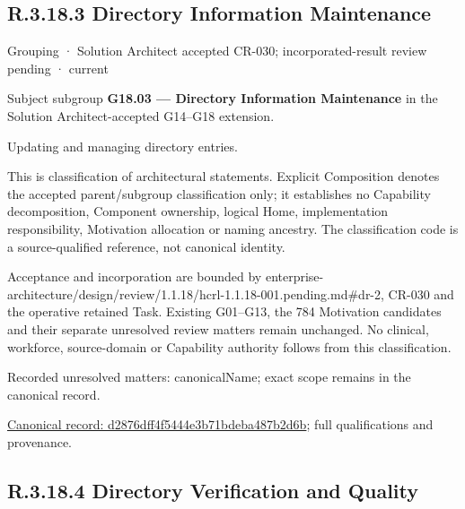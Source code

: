 \subsection*{R.3.18.3 Directory Information Maintenance}
\label{navigation:R.3.18.3}

\label{element:d2876dff4f5444e3b71bdeba487b2d6b}
{\small Grouping · Solution Architect accepted CR-030; incorporated-result review pending · current}\par

Subject subgroup \textbf{G18.03 — Directory Information Maintenance} in the Solution Architect-accepted G14–G18 extension.



Updating and managing directory entries.



This is classification of architectural statements. Explicit Composition denotes the accepted parent/subgroup classification only; it establishes no Capability decomposition, Component ownership, logical Home, implementation responsibility, Motivation allocation or naming ancestry. The classification code is a source-qualified reference, not canonical identity.



Acceptance and incorporation are bounded by enterprise-architecture/design/review/1.1.18/hcrl-1.1.18-001.pending.md\#dr-2, CR-030 and the operative retained Task. Existing G01–G13, the 784 Motivation candidates and their separate unresolved review matters remain unchanged. No clinical, workforce, source-domain or Capability authority follows from this classification.


{\small Recorded unresolved matters: canonicalName; exact scope remains in the canonical record.}\par
{\footnotesize \href{../../../../continuum/grouping/d2876dff4f5444e3b71bdeba487b2d6b.md}{Canonical record: d2876dff4f5444e3b71bdeba487b2d6b}; full qualifications and provenance.}\par
\subsection*{R.3.18.4 Directory Verification and Quality}
\label{navigation:R.3.18.4}

